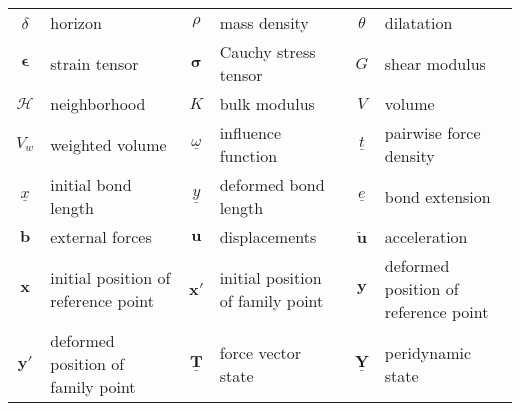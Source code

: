 \begin{table}[h!]
\begin{tabularx}{\linewidth}{@{}cXcXcX@{}}
 $\delta$                 & horizon&
 $\rho$                   & mass density&
 $\theta$                 & dilatation\\
 $\boldsymbol{\epsilon}$  & strain tensor&
 $\boldsymbol{\sigma}$    & Cauchy stress tensor&
 $G$                      & shear modulus\\
 $\mathcal{H}$            & neighborhood&
 $K$                      & bulk modulus&
 $V$                      & volume\\
 $V_w$                    & weighted volume&
 $\underline{\omega}$     & influence function&
 $\underline{t}$          & pairwise force density\\
 $\underline{x}$          & initial bond length&
 $\underline{y}$          & deformed bond length&
 $\underline{e}$          & bond extension\\
 $\mathbf{b}$             & external forces&
 $\mathbf{u}$             & displacements&
 $\mathbf{\ddot u}$       & acceleration\\
 $\mathbf{x}$             & initial position of reference point&
 $\mathbf{x}'$            & initial position of family point&
 $\mathbf{y}$             & deformed position of reference point\\
 $\mathbf{y}'$            & deformed position of family point&
 $\mathbf{\underline{T}}$ & force vector state&
 $\mathbf{\underline{Y}}$ & peridynamic state
\end{tabularx} 
\end{table}